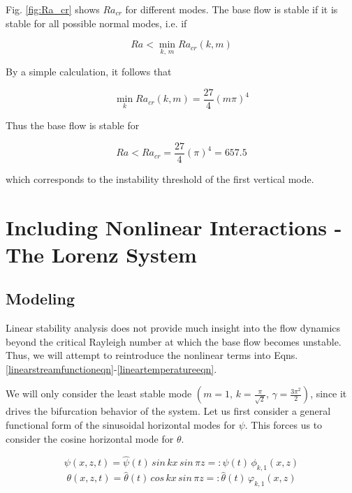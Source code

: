 \documentclass[paper=a4, fontsize=11pt]{scrartcl}
\numberwithin{equation}{section}		%
\numberwithin{figure}{section}			%
\numberwithin{table}{section}				%
\begin{document}
\noindent Fig. \ref{fig:Ra_cr} shows $Ra_{cr}$ for different modes. The base flow is stable if it is stable for all possible normal modes, i.e. if 

\begin{equation}
	Ra < \min_{k,\,m} Ra_{cr}(k,m)
\end{equation}

\noindent By a simple calculation, it follows that

\begin{equation}
	\min_{k} Ra_{cr}(k,m) = \frac{27}{4}(m \pi)^4
\end{equation}

\noindent Thus the base flow is stable for 

\begin{equation}
	Ra < Ra_{cr} = \frac{27}{4}(\pi)^4 = 657.5
\end{equation}

\noindent which corresponds to the instability threshold of the first vertical mode.

\section{Including Nonlinear Interactions - The Lorenz System}

\subsection{Modeling}
Linear stability analysis does not provide much insight into the flow dynamics beyond the critical Rayleigh number at which the base flow becomes unstable. Thus, we will attempt to reintroduce the nonlinear terms into Eqns. \ref{linearstreamfunctioneqn}-\ref{lineartemperatureeqn}.

We will only consider the least stable mode $(m=1, \, k = \frac{\pi}{\sqrt{2}}, \, \gamma = \frac{3\pi^2}{2})$, since it drives the bifurcation behavior of the system. Let us first consider a general functional form of the sinusoidal horizontal modes for $\psi$. This forces us to consider the cosine horizontal mode for $\theta$.

\begin{equation}
	\psi(x,z,t) = \hat{\psi}(t) \, sin \, kx  \, sin \, \pi z =: \hat{\psi}(t) \, \phi_{k,1}(x,z)
	\label{initpsi}
\end{equation}
\begin{equation}
	\theta(x,z,t) = \hat{\theta}(t) \, cos \, kx  \, sin \, \pi z =: \hat{\theta}(t) \, \varphi_{k,1}(x,z)
	\label{inittheta}
\end{equation}
\end{document}
